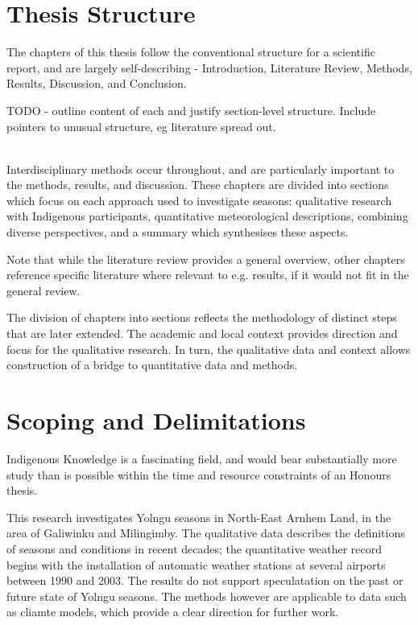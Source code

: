 \section{Thesis Structure}

The chapters of this thesis follow the conventional structure for a scientific
report, and are largely self-describing - Introduction, Literature Review,
Methods, Results, Discussion, and Conclusion.

TODO - outline content of each and justify section-level structure.
Include pointers to unusual structure, eg literature spread out.

~\\

Interdisciplinary methods occur throughout, and are particularly important
to the methods, results, and discussion.  These chapters are divided into
sections which focus on each approach used to investigate seasons:
qualitative research with Indigenous participants,
quantitative meteorological descriptions,
combining diverse perspectives, and
a summary which synthesises these aspects.

Note that while the literature review provides a general overview,
other chapters reference specific literature where relevant to e.g.
results, if it would not fit in the general review.

The division of chapters into sections
reflects the methodology of distinct steps that are
later extended.  The academic and local context provides direction and focus
for the qualitative research.  In turn, the qualitative data and context
allows construction of a bridge to quantitative data and methods.



\section{Scoping and Delimitations}
Indigenous Knowledge is a fascinating field, and would bear substantially
more study than is possible within the time and resource constraints of
an Honours thesis.

This research investigates Yolngu seasons in North-East Arnhem Land, in
the area of Galiwinku and Milingimby.  The qualitative data describes the
definitions of seasons and conditions in recent decades; the quantitative
weather record begins with the installation of automatic weather stations
at several airports between 1990 and 2003.  The results do not support
speculatation on the past or future state of Yolngu seasons.  The methods
however are applicable to data such as cliamte models, which provide
a clear direction for further work.

